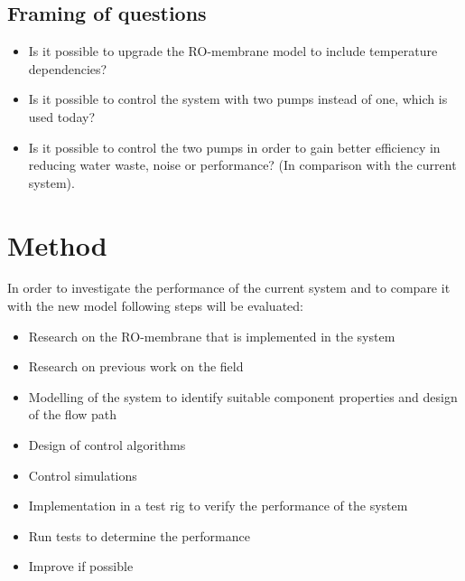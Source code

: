 \subsection{Framing of questions}
\begin{itemize}
\renewcommand\labelitemi{-}
   \item Is it possible to upgrade the RO-membrane model to include temperature dependencies?
   \item Is it possible to control the system with two pumps instead of one, which is used today?
    \item Is it possible to control the two pumps in order to gain better efficiency in reducing water waste, noise or performance? (In comparison with the current system).   
\end{itemize}


\section{Method}

In order to investigate the performance of the current system and to compare it with the new model following steps will be evaluated:

\begin{itemize}
\renewcommand\labelitemi{-}
    \item Research on the RO-membrane that is implemented in the system  
    \item Research on previous work on the field
    \item Modelling of the system to identify suitable component properties and design of the flow path
    \item Design of control algorithms
    \item Control simulations
    \item Implementation in a test rig to verify the performance of the system
    \item Run tests to determine the performance
    \item Improve if possible
\end{itemize}




